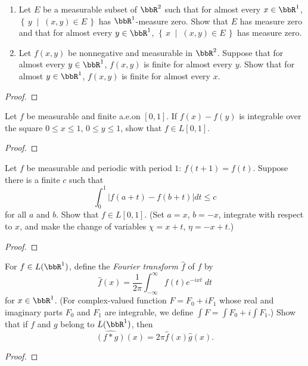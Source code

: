 
\begin{problem}
\begin{enumerate}[label=(\alph*)]
\item Let $E$ be a measurable subset of $\bbR^2$ such that for almost every
  $x\in\bbR^1$, $\left\{\,y\;\middle|\;(x,y)\in E\,\right\}$ has
  $\bbR^1$-measure zero. Show that $E$ has measure zero and that for almost
  every $y\in\bbR^1$, $\left\{\,x\;\middle|\;(x,y)\in E\,\right\}$ has
  measure zero.
\item Let $f(x,y)$ be nonnegative and measurable in $\bbR^2$. Suppose that
  for almost every $y\in\bbR^1$, $f(x,y)$ is finite for almost every
  $y$. Show that for almost $y\in\bbR^1$, $f(x,y)$ is finite for almost
  every $x$.
\end{enumerate}
\end{problem}
\begin{proof}
\end{proof}
\newpage

\begin{problem}
Let $f$ be measurable and finite a.e.\@ on $[0,1]$. If $f(x)-f(y)$ is
integrable over the square $0\leq x\leq 1$, $0\leq y\leq 1$, show that
$f\in L[0,1]$.
\end{problem}
\begin{proof}
\end{proof}
\newpage

\begin{problem}
Let $f$ be measurable and periodic with period $1$: $f(t+1)=f(t)$. Suppose
there is a finite $c$ such that
\[
\int_0^1\left|f(a+t)-f(b+t)\right|dt\leq c
\]
for all $a$ and $b$. Show that $f\in L[0,1]$. (Set $a=x$, $b=-x$, integrate
with respect to $x$, and make the change of variables $\chi=x+t$,
$\eta=-x+t$.)
\end{problem}
\begin{proof}
\end{proof}
\newpage

\begin{problem}
For $f\in L(\bbR^1)$, define the \emph{Fourier transform $\hat f$} of $f$
by
\[
\hat f(x)=\frac{1}{2\pi}\int_{-\infty}^\infty f(t)e^{-ixt}\;dt
\]
for $x\in\bbR^1$. (For complex-valued function $F=F_0+iF_1$ whose real and
imaginary parts $F_0$ and $F_1$ are integrable, we define $\int F=\int
F_0+i\int F_1$.) Show that if $f$ and $g$ belong to $L(\bbR^1)$, then
\[
\widehat{(f*g)}(x)=2\pi\hat f(x)\hat g(x).
\]
\end{problem}
\begin{proof}
\end{proof}
\newpage

